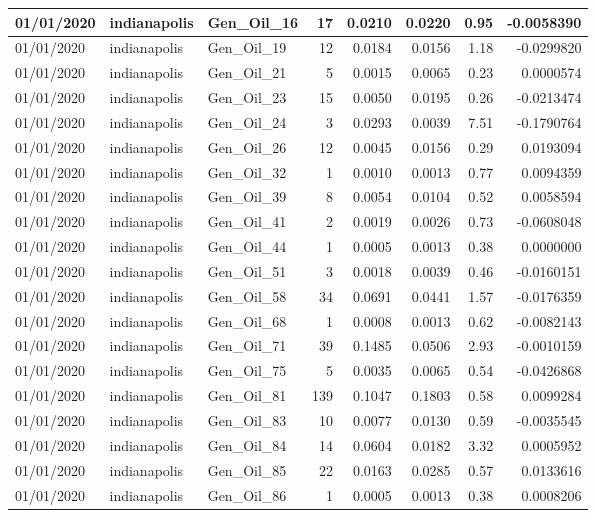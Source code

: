 \documentclass[
  letterpaper,
  DIV=11,
  numbers=noendperiod]{scrartcl}
\begin{document}
\begin{tabular}{l|l|l|r|r|r|r|r}
\hline
01/01/2020 & indianapolis & Gen\_Oil\_16 & 17 & 0.0210 & 0.0220 & 0.95 & -0.0058390\\
\hline
01/01/2020 & indianapolis & Gen\_Oil\_19 & 12 & 0.0184 & 0.0156 & 1.18 & -0.0299820\\
\hline
01/01/2020 & indianapolis & Gen\_Oil\_21 & 5 & 0.0015 & 0.0065 & 0.23 & 0.0000574\\
\hline
01/01/2020 & indianapolis & Gen\_Oil\_23 & 15 & 0.0050 & 0.0195 & 0.26 & -0.0213474\\
\hline
01/01/2020 & indianapolis & Gen\_Oil\_24 & 3 & 0.0293 & 0.0039 & 7.51 & -0.1790764\\
\hline
01/01/2020 & indianapolis & Gen\_Oil\_26 & 12 & 0.0045 & 0.0156 & 0.29 & 0.0193094\\
\hline
01/01/2020 & indianapolis & Gen\_Oil\_32 & 1 & 0.0010 & 0.0013 & 0.77 & 0.0094359\\
\hline
01/01/2020 & indianapolis & Gen\_Oil\_39 & 8 & 0.0054 & 0.0104 & 0.52 & 0.0058594\\
\hline
01/01/2020 & indianapolis & Gen\_Oil\_41 & 2 & 0.0019 & 0.0026 & 0.73 & -0.0608048\\
\hline
01/01/2020 & indianapolis & Gen\_Oil\_44 & 1 & 0.0005 & 0.0013 & 0.38 & 0.0000000\\
\hline
01/01/2020 & indianapolis & Gen\_Oil\_51 & 3 & 0.0018 & 0.0039 & 0.46 & -0.0160151\\
\hline
01/01/2020 & indianapolis & Gen\_Oil\_58 & 34 & 0.0691 & 0.0441 & 1.57 & -0.0176359\\
\hline
01/01/2020 & indianapolis & Gen\_Oil\_68 & 1 & 0.0008 & 0.0013 & 0.62 & -0.0082143\\
\hline
01/01/2020 & indianapolis & Gen\_Oil\_71 & 39 & 0.1485 & 0.0506 & 2.93 & -0.0010159\\
\hline
01/01/2020 & indianapolis & Gen\_Oil\_75 & 5 & 0.0035 & 0.0065 & 0.54 & -0.0426868\\
\hline
01/01/2020 & indianapolis & Gen\_Oil\_81 & 139 & 0.1047 & 0.1803 & 0.58 & 0.0099284\\
\hline
01/01/2020 & indianapolis & Gen\_Oil\_83 & 10 & 0.0077 & 0.0130 & 0.59 & -0.0035545\\
\hline
01/01/2020 & indianapolis & Gen\_Oil\_84 & 14 & 0.0604 & 0.0182 & 3.32 & 0.0005952\\
\hline
01/01/2020 & indianapolis & Gen\_Oil\_85 & 22 & 0.0163 & 0.0285 & 0.57 & 0.0133616\\
\hline
01/01/2020 & indianapolis & Gen\_Oil\_86 & 1 & 0.0005 & 0.0013 & 0.38 & 0.0008206\\

\end{tabular}
\end{document}
